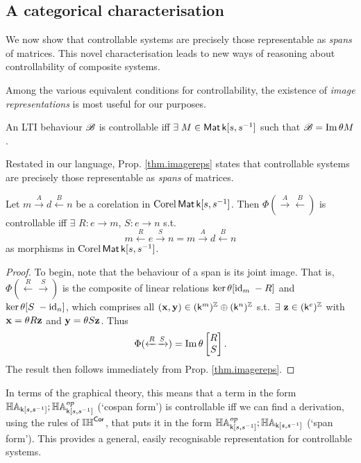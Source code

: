 \subsection{A categorical characterisation}
We now show that controllable systems are precisely those representable as
\emph{spans} of matrices. This novel characterisation leads to new ways of
reasoning about controllability of composite systems. 

Among the various equivalent conditions for controllability, the existence of
\emph{image representations} is most useful for our purposes.
\begin{proposition} \label{thm.imagereps}
  An LTI behaviour ${\mathscr B}$ is controllable iff $\exists\; M \in \operatorname{\mathsf{Mat}}{\mathsf{k}[s,s^{-1}]}$ such that ${\mathscr B} = \mathrm{Im}\, \theta M$.
\end{proposition}

Restated in our language, Prop. \ref{thm.imagereps} states that controllable
systems are precisely those representable as \emph{spans} of matrices. 

\begin{theorem} \label{cor.spanreps}
  Let $m \xrightarrow{A} d \xleftarrow{B} n$ be a corelation in $\operatorname{{Corel}}\operatorname{\mathsf{Mat}}{\mathsf{k}[s,s^{-1}]}$. Then
  $\Phi(\xrightarrow{A}\xleftarrow{B})$ is controllable iff $\exists$ $R: e \to m$, $S: e\to n$ s.t.
  \[
    m \xleftarrow{R} e \xrightarrow{S} n = m \xrightarrow{A} d \xleftarrow{B} n
  \]
  as morphisms in $\operatorname{{Corel}}\operatorname{\mathsf{Mat}}{\mathsf{k}[s,s^{-1}]}$. 
\end{theorem}
\begin{proof}
  To begin, note that the behaviour of a span is its joint image. That is,
  $\Phi(\xleftarrow{R}\xrightarrow{S})$ is the composite of linear
  relations $\ker\theta[\mathrm{id}_m \; -R]$ and $\ker\theta[S\;
  -\mathrm{id}_n]$, which comprises all $(\mathbf{x},\mathbf{y}) \in (\mathsf{k}^m)^{\mathbb Z}
  \oplus (\mathsf{k}^n)^{\mathbb Z}$ s.t.\ $\exists$ $\mathbf{z} \in (\mathsf{k}^e)^{\mathbb Z}$ with
  $\mathbf{x} = \theta R \mathbf{z}$ and $\mathbf{y} = \theta S
  \mathbf{z}$. Thus
  \[
    \Phi(\xleftarrow{R}\xrightarrow{S}) = \mathrm{Im}\, \theta \left[
    \begin{matrix} R \\ S \end{matrix} \right].
  \]
  The result then follows immediately from Prop. \ref{thm.imagereps}.  
\end{proof}

In terms of the graphical theory, this means that a term in the 
form $\mathbb{HA}_{\mathsf{k}[s,s^{-1}]} ; \mathbb{HA}_{\mathsf{k}[s,s^{-1}]}^{op}$ (`cospan form') is controllable iff we can find a
derivation, using the rules of $\mathbb{IH}^{\mathsf{Cor}}$, that puts it in the form $\mathbb{HA}_{\mathsf{k}[s,s^{-1}]}^{op}
; \mathbb{HA}_{\mathsf{k}[s,s^{-1}]}$ (`span form').  This provides a general, easily recognisable
representation for controllable systems. 

